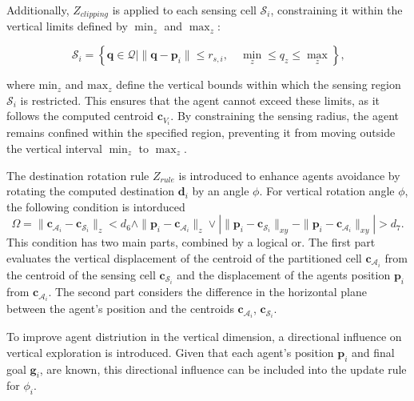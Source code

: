         Additionally, $Z_{clipping}$ is applied to each sensing cell $\mathcal{S}_i$, constraining it within the vertical limits defined by $\min_z$ and $\max_z$:

        \begin{equation}
            \mathcal{S}_i = \left\{\mathbf{q} \in \mathcal{Q} \mid \|\mathbf{q} - \mathbf{p}_i\| \leq r_{s,i}, \quad \min_z \leq q_z \leq \max_z \right\}\text{,}
        \end{equation}

        where $\text{min}_z$ and $\text{max}_z$ define the vertical bounds within which the sensing region $\mathcal{S}_i$ is restricted. 
        This ensures that the agent cannot exceed these limits, as it follows the computed centroid \( \mathbf{c}_{V_i} \). 
        By constraining the sensing radius, the agent remains confined within the specified region, preventing it from moving outside the vertical interval $\min_z$ to $\max_z$.

        The destination rotation rule $Z_{rule}$ is introduced to enhance agents avoidance by rotating the computed destination $\mathbf{d}_i$ by an angle $\phi$.
        For vertical rotation angle $\phi$, the following condition is intorduced
        \begin{equation}
            \label{eqn:phi_condition}
            \Omega = \|\mathbf{c}_{\mathcal{A}_i} - \mathbf{c}_{\mathcal{S}_i}\|_z < d_6 \land \|\mathbf{p}_i - \mathbf{c}_{\mathcal{A}_i}\|_z \lor 
            | \|\mathbf{p}_i - \mathbf{c}_{\mathcal{S}_i}\|_{xy} - \|\mathbf{p}_i - \mathbf{c}_{\mathcal{A}_i}\|_{xy} | > d_7 \text{.}
        \end{equation}
        This condition has two main parts, combined by a logical or. The first part evaluates the vertical displacement of the centroid of the partitioned cell $\mathbf{c}_{\mathcal{A}_i}$ from the centroid of the sensing cell $\mathbf{c}_{\mathcal{S}_i}$ and the
        displacement of the agents position $\mathbf{p}_i$ from  $\mathbf{c}_{\mathcal{A}_i}$.
        The second part considers the difference in the horizontal plane between the agent's position and the centroids $\mathbf{c}_{\mathcal{A}_i}$, $\mathbf{c}_{\mathcal{S}_i}$.

        To improve agent distriution in the vertical dimension, a directional influence on vertical exploration is introduced. 
        Given that each agent's position $\mathbf{p}_i$ and final goal $\mathbf{g}_i$, are known, this directional influence can be included into the update rule for $\phi_i$.

